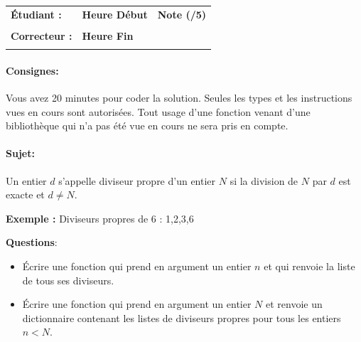 \documentclass[a4paper,11pt]{article}
\begin{document}
\begin{table}[h!]
\centering
\renewcommand{\arraystretch}{1.4} %
\begin{tabular}{|p{10cm}|p{3cm}|p{2cm}|}
\hline
\textbf{Étudiant :} & \textbf{Heure Début }  & \textbf{Note (/5) }  \\
& & \\
\hline
\textbf{Correcteur :} & \textbf{Heure Fin } & \\
& & \\
\hline

\hline
\end{tabular}
\end{table}
\vspace{-0.4 cm}
\paragraph*{Consignes:} Vous avez 20 minutes pour coder la solution. Seules les types et les instructions vues en cours sont autorisées. Tout usage d'une fonction 
venant d'une bibliothèque qui n'a pas été vue en cours ne sera pris en compte. 





\vspace{-0.2 cm}
\vspace{-0.2 cm}
\paragraph*{Sujet:}

Un entier $d$ s'appelle diviseur propre d'un entier $N$ si la division de $N$ par $d$ est exacte et $d \ne N$. 

\vspace{0.5 cm}

\textbf{Exemple :}  
Diviseurs propres de 6 : 1,2,3,6


\vspace{0.5 cm}
\textbf{Questions}: 

\begin{itemize}
    \item[1.]  \'Ecrire une fonction qui prend en argument un entier $n$ et qui renvoie la liste de tous ses diviseurs. 
    \item[2.]  \'Ecrire une fonction qui prend en argument un entier $N$ et renvoie un dictionnaire contenant les listes de diviseurs propres pour tous les entiers $n  <N$. 
    
\end{itemize}
\end{document}

